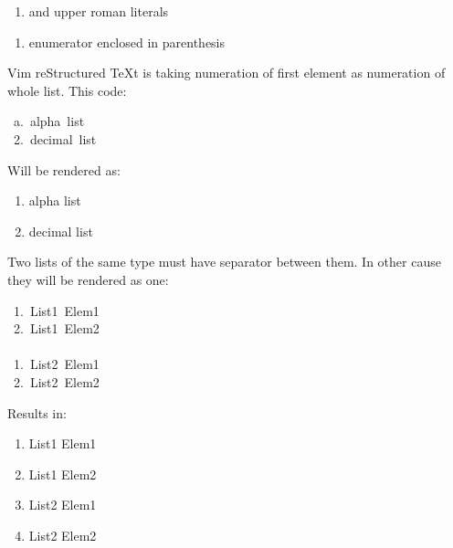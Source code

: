 \documentclass[12pt]{article}
\begin{document}
\begin{enumerate}[label=\Roman*.]
\begin{enumerate}[label=\Roman*.]
\begin{enumerate}[label=\Roman*.]
\begin{enumerate}[label=\Roman*.]
\begin{enumerate}[label=\Roman*.]
\begin{enumerate}[label=\Roman*.]
\end{enumerate}
\end{enumerate}
\end{enumerate}
\end{enumerate}
\end{enumerate}

\item
and upper roman literals
\end{enumerate}
\begin{enumerate}[label=\alph*.]
\item
enumerator enclosed in parenthesis
\end{enumerate}

Vim reStructured \TeX{}t is taking numeration of first element as numeration of whole
list. This code:

\begin{ttfamily}\begin{flushleft}
\mbox{~a.~alpha~list}\\
\mbox{~2.~decimal~list}\\
\end{flushleft}\end{ttfamily}

Will be rendered as:

 \begin{enumerate}[label=\alph*.]
\item
alpha list

\item
decimal list
\end{enumerate}

Two lists of the same type must have separator between them. In other
cause they will be rendered as one:

\begin{ttfamily}\begin{flushleft}
\mbox{~1.~List1~Elem1}\\
\mbox{~2.~List1~Elem2}\\
\mbox{}\\
\mbox{~1.~List2~Elem1}\\
\mbox{~2.~List2~Elem2}\\
\end{flushleft}\end{ttfamily}

Results in:

\begin{enumerate}[label=\arabic*.]
\item
List1 Elem1

\item
List1 Elem2

\item
List2 Elem1

\item
List2 Elem2
\end{enumerate}
\end{document}
